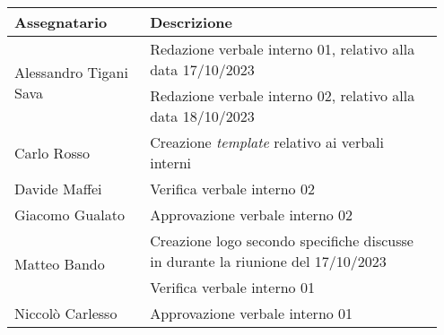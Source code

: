 \begin{center}
{
\renewcommand{\arraystretch}{1.5}
\begin{tabular}{p{0.30\linewidth}|p{0.65\linewidth}}
    \textbf{Assegnatario}    &   \textbf{Descrizione}  \\
    \hline
    \multirow{2}{*}{Alessandro Tigani Sava}  & Redazione verbale interno 01, relativo alla data 17/10/2023   \\
    \cline{2-2}
                            & Redazione verbale interno 02, relativo alla data 18/10/2023   \\
    \hline
    Carlo Rosso             & Creazione \textit{template} relativo ai verbali interni       \\
    \hline
    Davide Maffei           & Verifica verbale interno 02                                   \\
    \hline
    Giacomo Gualato         & Approvazione verbale interno 02                               \\
    \hline
    \multirow{2}{*}{Matteo Bando}           & Creazione logo secondo specifiche discusse in durante la riunione del 17/10/2023  \\
    \cline{2-2}
                            & Verifica verbale interno 01                                   \\
    \hline
    Niccolò Carlesso        & Approvazione verbale interno 01                               \\
\end{tabular}
}
\end{center}